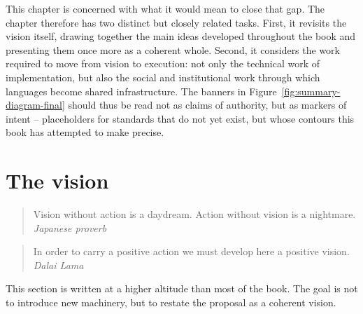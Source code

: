 This chapter is concerned with what it would mean to close that gap. The chapter therefore has two distinct but closely related tasks. First, it revisits the vision itself, drawing together the main ideas developed throughout the book and presenting them once more as a coherent whole. Second, it considers the work required to move from vision to execution: not only the technical work of implementation, but also the social and institutional work through which languages become shared infrastructure. The banners in Figure~\ref{fig:summary-diagram-final} should thus be read not as claims of authority, but as markers of intent -- placeholders for standards that do not yet exist, but whose contours this book has attempted to make precise.

\section{The vision}\label{sec:vision}


\begin{quotation}
\flushright Vision without action is a daydream. Action without vision is a nightmare.
\flushright\textit{Japanese proverb}
\end{quotation}

\begin{quotation}
\flushright In order to carry a positive action we must develop here a positive vision.
\flushright\textit{Dalai Lama}
\vspace{0.5cm}
\end{quotation}

\noindent This section is written at a higher altitude than most of the book. The goal is not to introduce new machinery, but to restate the proposal as a coherent vision.

%

